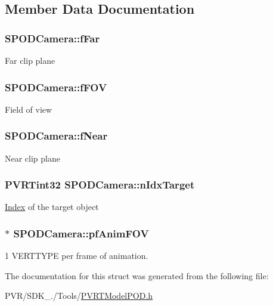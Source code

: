 \subsection{Member Data Documentation}
\hypertarget{struct_s_p_o_d_camera_a110c9dfd95bfbbbc16e9d6beffa1f8d2}{
\subsubsection[{f\+Far}]{ S\+P\+O\+D\+Camera\+::f\+Far}}\label{struct_s_p_o_d_camera_a110c9dfd95bfbbbc16e9d6beffa1f8d2}
Far clip plane \hypertarget{struct_s_p_o_d_camera_a9f4b6d0b87a0428fadda754d733fe0bf}{
\subsubsection[{f\+F\+O\+V}]{ S\+P\+O\+D\+Camera\+::f\+F\+O\+V}}\label{struct_s_p_o_d_camera_a9f4b6d0b87a0428fadda754d733fe0bf}
Field of view \hypertarget{struct_s_p_o_d_camera_ac9bf09d3c1bd4fb4c163dced9ae0bb96}{
\subsubsection[{f\+Near}]{ S\+P\+O\+D\+Camera\+::f\+Near}}\label{struct_s_p_o_d_camera_ac9bf09d3c1bd4fb4c163dced9ae0bb96}
Near clip plane \hypertarget{struct_s_p_o_d_camera_a83a1f59c9e6227cb63a318f35f28f0c6}{
\subsubsection[{n\+Idx\+Target}]{\setlength{\rightskip}{0pt plus 5cm}P\+V\+R\+Tint32 S\+P\+O\+D\+Camera\+::n\+Idx\+Target}}\label{struct_s_p_o_d_camera_a83a1f59c9e6227cb63a318f35f28f0c6}
\hyperlink{struct_index}{Index} of the target object \hypertarget{struct_s_p_o_d_camera_a4f9a9a462f0564b7e03120dd31e027b3}{
\subsubsection[{pf\+Anim\+F\+O\+V}]{$\ast$ S\+P\+O\+D\+Camera\+::pf\+Anim\+F\+O\+V}}\label{struct_s_p_o_d_camera_a4f9a9a462f0564b7e03120dd31e027b3}
1 V\+E\+R\+T\+T\+Y\+P\+E per frame of animation. 

The documentation for this struct was generated from the following file\+:\begin{DoxyCompactItemize}
\item 
P\+V\+R/\+S\+D\+K\+\_./\+Tools/\hyperlink{_p_v_r_t_model_p_o_d_8h}{P\+V\+R\+T\+Model\+P\+O\+D.\+h}\end{DoxyCompactItemize}
